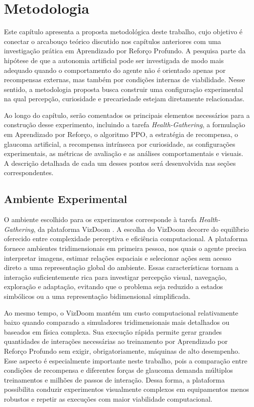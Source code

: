 \chapter{Metodologia}
\label{chap:metodologia}

Este capítulo apresenta a proposta metodológica deste trabalho, cujo objetivo é conectar o arcabouço teórico discutido nos capítulos anteriores com uma investigação prática em Aprendizado por Reforço Profundo. A pesquisa parte da hipótese de que a autonomia artificial pode ser investigada de modo mais adequado quando o comportamento do agente não é orientado apenas por recompensas externas, mas também por condições internas de viabilidade. Nesse sentido, a metodologia proposta busca construir uma configuração experimental na qual percepção, curiosidade e precariedade estejam diretamente relacionadas.

Ao longo do capítulo, serão comentados os principais elementos necessários para a construção desse experimento, incluindo a tarefa \textit{Health-Gathering}, a formulação em Aprendizado por Reforço, o algoritmo PPO, a estratégia de recompensa, o glaucoma artificial, a recompensa intrínseca por curiosidade, as configurações experimentais, as métricas de avaliação e as análises comportamentais e visuais. A descrição detalhada de cada um desses pontos será desenvolvida nas seções correspondentes.

\section{Ambiente Experimental}

O ambiente escolhido para os experimentos corresponde à tarefa \textit{Health-Gathering}, da plataforma VizDoom \cite{vizdoom}. A escolha do VizDoom decorre do equilíbrio oferecido entre complexidade perceptiva e eficiência computacional. A plataforma fornece ambientes tridimensionais em primeira pessoa, nos quais o agente precisa interpretar imagens, estimar relações espaciais e selecionar ações sem acesso direto a uma representação global do ambiente. Essas características tornam a interação suficientemente rica para investigar percepção visual, navegação, exploração e adaptação, evitando que o problema seja reduzido a estados simbólicos ou a uma representação bidimensional simplificada.

Ao mesmo tempo, o VizDoom mantém um custo computacional relativamente baixo quando comparado a simuladores tridimensionais mais detalhados ou baseados em física complexa. Sua execução rápida permite gerar grandes quantidades de interações necessárias ao treinamento por Aprendizado por Reforço Profundo sem exigir, obrigatoriamente, máquinas de alto desempenho. Esse aspecto é especialmente importante neste trabalho, pois a comparação entre condições de recompensa e diferentes forças de glaucoma demanda múltiplos treinamentos e milhões de passos de interação. Dessa forma, a plataforma possibilita conduzir experimentos visualmente complexos em equipamentos menos robustos e repetir as execuções com maior viabilidade computacional.

